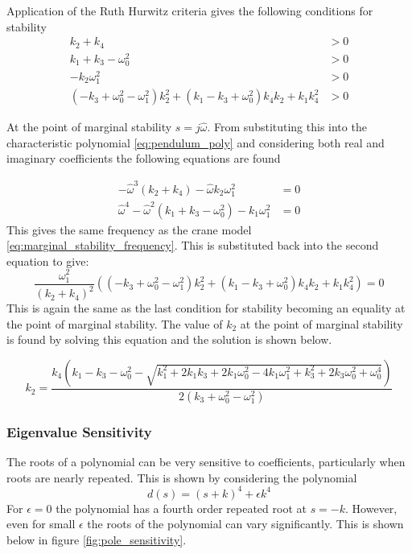 \documentclass{article}
\begin{document}
Application of the Ruth Hurwitz criteria gives the following conditions for stability
\begin{align}
  k_{2} + k_{4} &> 0 \\
  k_{1} + k_{3} - \omega_{0}^{2} &> 0 \\
  - k_{2} \omega_{1}^{2} &> 0 \\
  \left(- k_{3} + \omega_{0}^{2} - \omega_{1}^{2}\right) k_{2}^{2} + \left(k_{1} - k_{3} + \omega_{0}^{2}\right) k_{4} k_{2} + k_{1} k_{4}^{2} &> 0
\end{align}

At the point of marginal stability $s = j\hat{\omega}$.
From substituting this into the characteristic polynomial \ref{eq:pendulum_poly} and considering both real and imaginary coefficients the following equations are found

\begin{align}
  - \hat{\omega}^{3} \left(k_{2} + k_{4}\right) - \hat{\omega} k_{2} \omega_{1}^{2} &= 0\\
  \hat{\omega}^{4} - \hat{\omega}^{2} \left(k_{1} + k_{3} - \omega_{0}^{2}\right) - k_{1} \omega_{1}^{2} &= 0
\end{align}
This gives the same frequency as the crane model \ref{eq:marginal_stability_frequency}. This is substituted back into the second equation to give:
\begin{equation}
  \frac{\omega_1^2}{(k_2 + k_4)^2} \left( \left(- k_{3} + \omega_{0}^{2} - \omega_{1}^{2}\right) k_{2}^{2} + \left(k_{1} - k_{3} + \omega_{0}^{2}\right) k_{4} k_{2} + k_{1} k_{4}^{2} \right) = 0
\end{equation}
This is again the same as the last condition for stability becoming an equality at the point of marginal stability.
The value of $k_2$ at the point of marginal stability is found by solving this equation and the solution is shown below.

\begin{equation}
  k_2 = \frac{k_{4} \left(k_{1} - k_{3} - \omega_{0}^{2} - \sqrt{k_{1}^{2} + 2 k_{1} k_{3} + 2 k_{1} \omega_{0}^{2} - 4 k_{1} \omega_{1}^{2} + k_{3}^{2} + 2 k_{3} \omega_{0}^{2} + \omega_{0}^{4}}\right)}{2 \left(k_{3} + \omega_{0}^{2} - \omega_{1}^{2}\right)}
\end{equation}

\subsubsection{Eigenvalue Sensitivity}

The roots of a polynomial can be very sensitive to coefficients, particularly when roots are nearly repeated.
This is shown by considering the polynomial
\begin{equation}
  d(s) = (s+k)^4 + \epsilon k^4
\end{equation}
For $\epsilon = 0$ the polynomial has a fourth order repeated root at $s = -k$.
However, even for small $\epsilon$ the roots of the polynomial can vary significantly. This is shown below in figure \ref{fig:pole_sensitivity}.
\end{document}
